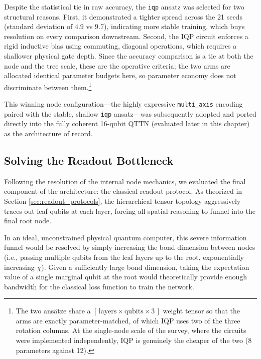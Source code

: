 \documentclass[12pt, a4paper, oneside]{report}
\begin{document}
Despite the statistical tie in raw accuracy, the \texttt{iqp} ansatz was selected for two structural reasons. First, it demonstrated a tighter spread across the 21 seeds (standard deviation of $4.9$ vs $9.7$), indicating more stable training, which buys resolution on every comparison downstream. Second, the IQP circuit enforces a rigid inductive bias using commuting, diagonal operations, which requires a shallower physical gate depth. Since the accuracy comparison is a tie at both the node and the tree scale, these are the operative criteria; the two arms are allocated identical parameter budgets here, so parameter economy does not discriminate between them.\footnote{The two ans\"{a}tze share a $[\,\text{layers} \times \text{qubits} \times 3\,]$ weight tensor so that the arms are exactly parameter-matched, of which IQP uses two of the three rotation columns. At the single-node scale of the survey, where the circuits were implemented independently, IQP is genuinely the cheaper of the two (8 parameters against 12).}

This winning node configuration—the highly expressive \texttt{multi\_axis} encoding paired with the stable, shallow \texttt{iqp} ansatz—was subsequently adopted and ported directly into the fully coherent 16-qubit QTTN (evaluated later in this chapter) as the architecture of record.

\subsection{Solving the Readout Bottleneck}

Following the resolution of the internal node mechanics, we evaluated the final component of the architecture: the classical readout protocol. As theorized in Section \ref{sec:readout_protocols}, the hierarchical tensor topology aggressively traces out leaf qubits at each layer, forcing all spatial reasoning to funnel into the final root node.

In an ideal, unconstrained physical quantum computer, this severe information funnel would be resolved by simply increasing the bond dimension between nodes (i.e., passing multiple qubits from the leaf layers up to the root, exponentially increasing $\chi$). Given a sufficiently large bond dimension, taking the expectation value of a single marginal qubit at the root would theoretically provide enough bandwidth for the classical loss function to train the network.
\end{document}
